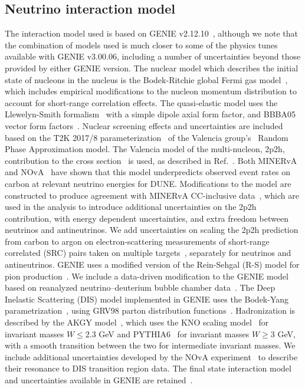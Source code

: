 \subsection{Neutrino interaction model}
The interaction model used is based on GENIE v2.12.10~\cite{Andreopoulos:2009rq,Andreopoulos:2015wxa}, although we note that the combination of models used is much closer to some of the physics tunes available with GENIE v3.00.06, including a number of uncertainties beyond those provided by either GENIE version. The nuclear model which describes the initial state of nucleons in the nucleus is the Bodek-Ritchie global Fermi gas model~\cite{BodekRitchie}, which includes empirical modifications to the nucleon momentum distribution to account for short-range correlation effects. The quasi-elastic model uses the Llewelyn-Smith formalism~\cite{llewelyn-smith} with a simple dipole axial form factor, and BBBA05 vector form factors~\cite{bbba05}. Nuclear screening effects and uncertainties are included based on the T2K 2017/8 parameterization~\cite{Abe:2018wpn} of the Valencia group's~\cite{nieves1,nieves2} Random Phase Approximation model. The Valencia model of the multi-nucleon, 2p2h, contribution to the cross section~\cite{nieves1,nieves2} is used, as described in Ref.~\cite{Schwehr:2016pvn}. Both MINERvA~\cite{Rodrigues:2015hik} and NOvA~\cite{NOvA:2018gge} have shown that this model underpredicts observed event rates on carbon at relevant neutrino energies for DUNE. Modifications to the model are constructed to produce agreement with MINERvA CC-inclusive data~\cite{Rodrigues:2015hik}, which are used in the analysis to introduce additional uncertainties on the 2p2h contribution, with energy dependent uncertainties, and extra freedom between neutrinos and antineutrinos. We add uncertainties on scaling the 2p2h prediction from carbon to argon on electron-scattering measurements of short-range correlated (SRC) pairs taken on multiple targets~\cite{Colle:2015ena}, separately for neutrinos and antineutrinos. GENIE uses a modified version of the Rein-Sehgal (R-S) model for pion production~\cite{Rein:1980wg}. We include a data-driven modification to the GENIE model based on reanalyzed neutrino--deuterium bubble chamber data~\cite{Wilkinson:2014yfa,Rodrigues:2016xjj}. The Deep Inelastic Scattering (DIS) model implemented in GENIE uses the Bodek-Yang parametrization~\cite{Bodek:2002ps}, using GRV98 parton distribution functions~\cite{Gluck:1998xa}. Hadronization is described by the AKGY model~\cite{Yang:2009zx}, which uses the KNO scaling model~\cite{Koba:1972ng} for invariant masses $W \leq 2.3$ GeV and PYTHIA6~\cite{Sjostrand:2006za} for invariant masses $W \geq 3$ GeV, with a smooth transition between the two for intermediate invariant masses. We include additional uncertainties developed by the NOvA experiment~\cite{nova_2018} to describe their resonance to DIS transition region data. The final state interaction model and uncertainties available in GENIE are retained~\cite{Dytman:2011zz,Dytman:2015taa,intranuke_2009}.

